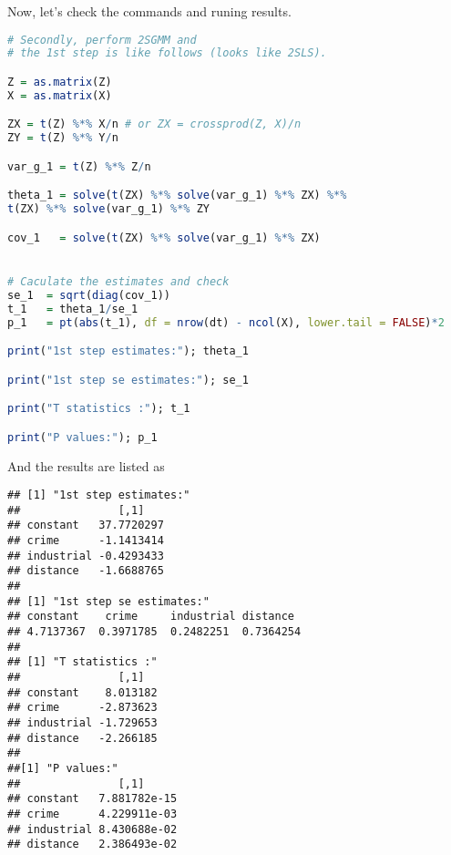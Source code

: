 \documentclass{article}
\theoremstyle{definition}
\begin{document}
Now, let's check the commands and runing results.
\begin{lstlisting}[language= R]
# Secondly, perform 2SGMM and 
# the 1st step is like follows (looks like 2SLS).

Z = as.matrix(Z)
X = as.matrix(X)

ZX = t(Z) %*% X/n # or ZX = crossprod(Z, X)/n
ZY = t(Z) %*% Y/n

var_g_1 = t(Z) %*% Z/n

theta_1 = solve(t(ZX) %*% solve(var_g_1) %*% ZX) %*% 
t(ZX) %*% solve(var_g_1) %*% ZY

cov_1   = solve(t(ZX) %*% solve(var_g_1) %*% ZX)


# Caculate the estimates and check
se_1  = sqrt(diag(cov_1))
t_1   = theta_1/se_1
p_1   = pt(abs(t_1), df = nrow(dt) - ncol(X), lower.tail = FALSE)*2

print("1st step estimates:"); theta_1

print("1st step se estimates:"); se_1

print("T statistics :"); t_1

print("P values:"); p_1
\end{lstlisting}

And the results are listed as
\begin{verbatim}
## [1] "1st step estimates:"
##               [,1]
## constant   37.7720297
## crime      -1.1413414
## industrial -0.4293433
## distance   -1.6688765
##
## [1] "1st step se estimates:"
## constant    crime     industrial distance 
## 4.7137367  0.3971785  0.2482251  0.7364254
## 
## [1] "T statistics :"
##               [,1]
## constant    8.013182
## crime      -2.873623
## industrial -1.729653
## distance   -2.266185
##
##[1] "P values:"
##               [,1]
## constant   7.881782e-15
## crime      4.229911e-03
## industrial 8.430688e-02
## distance   2.386493e-02
\end{verbatim}
\end{document}
